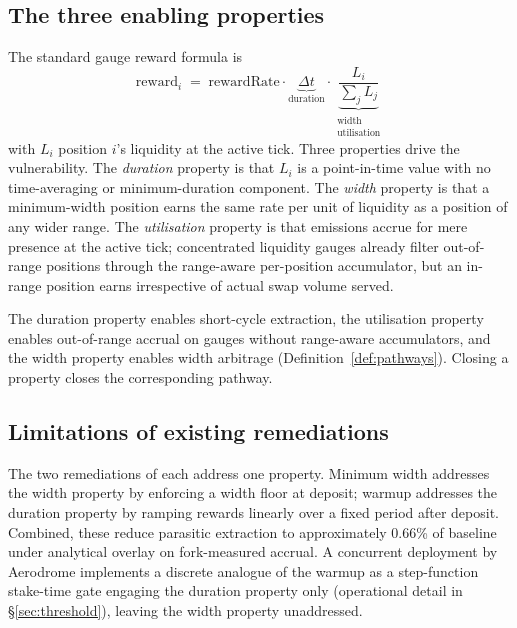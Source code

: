 \documentclass[11pt,a4paper]{article}
\theoremstyle{definition}
\theoremstyle{plain}
\theoremstyle{remark}
\begin{document}
\subsection{The three enabling properties}\label{sec:properties}

The standard gauge reward formula is
\begin{equation}
\text{reward}_i \;=\; \text{rewardRate} \cdot \underbrace{\Delta t}_{\text{duration}} \cdot \underbrace{\frac{L_i}{\sum_j L_j}}_{\substack{\text{width} \\ \text{utilisation}}}
\end{equation}
with $L_i$ position $i$'s liquidity at the active tick. Three properties drive the vulnerability\cite{ryan2026c}. The \emph{duration} property is that $L_i$ is a point-in-time value with no time-averaging or minimum-duration component. The \emph{width} property is that a minimum-width position earns the same rate per unit of liquidity as a position of any wider range. The \emph{utilisation} property is that emissions accrue for mere presence at the active tick; concentrated liquidity gauges already filter out-of-range positions through the range-aware per-position accumulator, but an in-range position earns irrespective of actual swap volume served.

The duration property enables short-cycle extraction, the utilisation property enables out-of-range accrual on gauges without range-aware accumulators, and the width property enables width arbitrage (Definition~\ref{def:pathways}). Closing a property closes the corresponding pathway.

\subsection{Limitations of existing remediations}\label{sec:insufficient}

The two remediations of\cite{ryan2026c} each address one property. Minimum width addresses the width property by enforcing a width floor at deposit; warmup addresses the duration property by ramping rewards linearly over a fixed period after deposit. Combined, these reduce parasitic extraction to approximately 0.66\% of baseline under analytical overlay on fork-measured accrual\cite{ryan2026c}. A concurrent deployment by Aerodrome\cite{aerodrome2026} implements a discrete analogue of the warmup as a step-function stake-time gate engaging the duration property only (operational detail in \S\ref{sec:threshold}), leaving the width property unaddressed.
\end{document}
